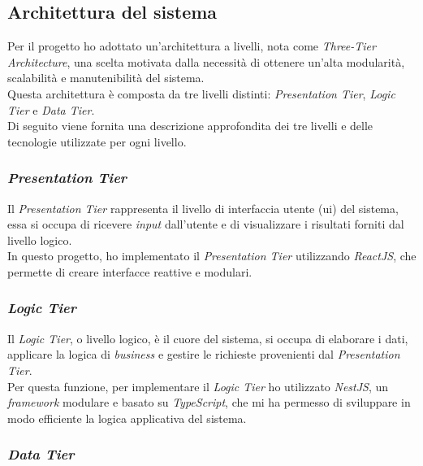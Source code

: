 \subsection{Architettura del sistema}
\label{subsec:architettura}

Per il progetto ho adottato un'architettura a livelli, nota come \textit{Three-Tier Architecture}, una scelta motivata dalla necessità di ottenere un'alta modularità, scalabilità e manutenibilità del sistema.\\
Questa architettura è composta da tre livelli distinti: \textit{Presentation Tier}, \textit{Logic Tier} e \textit{Data Tier}.\\

\noindent Di seguito viene fornita una descrizione approfondita dei tre livelli e delle tecnologie utilizzate per ogni livello.

\subsubsection{\textit{Presentation Tier}}

\noindent Il \textit{Presentation Tier} rappresenta il livello di interfaccia utente (\gls{ui}) del sistema,
essa si occupa di ricevere \textit{input} dall'utente e di visualizzare i risultati forniti dal livello logico.\\
In questo progetto, ho implementato il \textit{Presentation Tier} utilizzando \textit{ReactJS}, che permette di creare interfacce reattive e modulari.

\subsubsection{\textit{Logic Tier}} 

\noindent Il \textit{Logic Tier}, o livello logico, è il cuore del sistema,
si occupa di elaborare i dati, applicare la logica di \textit{business} e gestire le richieste provenienti dal \textit{Presentation Tier}.\\
Per questa funzione, per implementare il \textit{Logic Tier} ho utilizzato \textit{NestJS}, un \textit{framework} modulare e basato su \textit{TypeScript}, che mi ha permesso di sviluppare in modo efficiente la logica applicativa del sistema.

\subsubsection{\textit{Data Tier}} 

